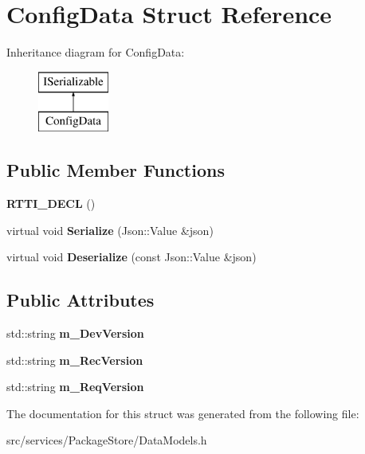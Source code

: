 \hypertarget{struct_config_data}{}\section{Config\+Data Struct Reference}
\label{struct_config_data}
Inheritance diagram for Config\+Data\+:\begin{figure}[H]
\begin{center}
\leavevmode
\includegraphics[height=2.000000cm]{struct_config_data}
\end{center}
\end{figure}
\subsection*{Public Member Functions}
\begin{DoxyCompactItemize}
\item 
\mbox{\label{struct_config_data_a61f34480cd9613ec7d69ed669de35364}} 
{\bfseries R\+T\+T\+I\+\_\+\+D\+E\+CL} ()
\item 
\mbox{\label{struct_config_data_ae41cb65ae0331bdd5c2727b7169eed6f}} 
virtual void {\bfseries Serialize} (Json\+::\+Value \&json)
\item 
\mbox{\label{struct_config_data_a434b7ce05b63b7eda9503683d8d7563f}} 
virtual void {\bfseries Deserialize} (const Json\+::\+Value \&json)
\end{DoxyCompactItemize}
\subsection*{Public Attributes}
\begin{DoxyCompactItemize}
\item 
\mbox{\label{struct_config_data_a0358000d86f11dd0dcd8b162ad367ce9}} 
std\+::string {\bfseries m\+\_\+\+Dev\+Version}
\item 
\mbox{\label{struct_config_data_a26f4ce331b58899e9fe3be62624a5476}} 
std\+::string {\bfseries m\+\_\+\+Rec\+Version}
\item 
\mbox{\label{struct_config_data_a3eedc2fdb10342adac11a28628971930}} 
std\+::string {\bfseries m\+\_\+\+Req\+Version}
\end{DoxyCompactItemize}


The documentation for this struct was generated from the following file\+:\begin{DoxyCompactItemize}
\item 
src/services/\+Package\+Store/Data\+Models.\+h\end{DoxyCompactItemize}
